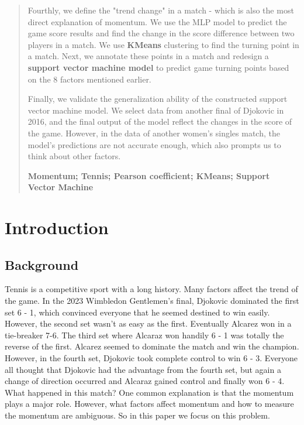 \documentclass{mcmthesis}
\begin{document}
\begin{abstract}
Fourthly, we define the "trend change" in a match - which is also the most direct explanation of momentum. We use the MLP model to predict the game score results and find the change in the score difference between two players in a match. We use \textbf{KMeans} clustering to find the turning point in a match. Next, we annotate these points in a match and redesign a \textbf{support vector machine model} to predict game turning points based on the 8 factors mentioned earlier.

Finally, we validate the generalization ability of the constructed support vector machine model. We select data from another final of Djokovic in 2016, and the final output of the model reflect the changes in the score of the game. However, in the data of another women's singles match, the model's predictions are not accurate enough, which also prompts us to think about other factors.
\begin{keywords}
\textbf{Momentum; Tennis; Pearson coefficient; KMeans; Support Vector Machine}
\end{keywords}
\end{abstract}
\maketitle
\tableofcontents
\newpage
\section{Introduction}
\subsection{Background}
Tennis is a competitive sport with a long history. Many factors affect the trend of the game. In the 2023 Wimbledon Gentlemen's final, Djokovic dominated the first set 6 - 1, which convinced everyone that he seemed destined to win easily. However, the second set wasn't as easy as the first. Eventually Alcarez won in a tie-breaker 7-6. The third set where Alcaraz won handily 6 - 1 was totally the reverse of the first. Alcarez seemed to dominate the match and win the champion. However, in the fourth set, Djokovic took complete control to win 6 - 3. Everyone all thought that Djokovic had the advantage from the fourth set, but again a change of direction occurred and Alcaraz gained control and finally won 6 - 4. What happened in this match? One common explanation is that the momentum plays a major role. However, what factors affect momentum and how to measure the momentum are ambiguous. So in this paper we focus on this problem.
\end{document}
